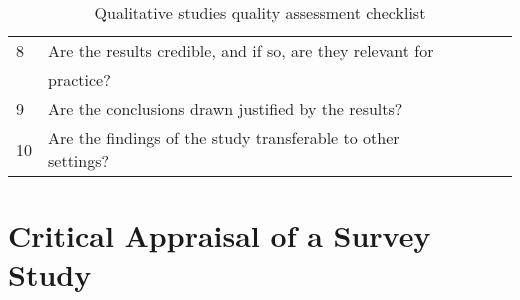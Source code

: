\begin{table}[H]
\begin{center}
{\begin{tabular}{|l||l|l|l|l|}
                        \hline
                        8  & Are the results credible, and if so, are they relevant for       &&& \\
                           & practice?                                                        &&& \\
                        \hline
                        9  & Are the conclusions drawn justified by the results?              &&& \\
                        \hline
                        10 & Are the findings of the study transferable to other settings?    &&& \\
                        \hline
                \end{tabular}}
        \end{center}
        \caption{Qualitative studies quality assessment checklist}
        \label{table:qualitativeStudy}
\end{table}
    

\section*{Critical Appraisal of a Survey Study}

